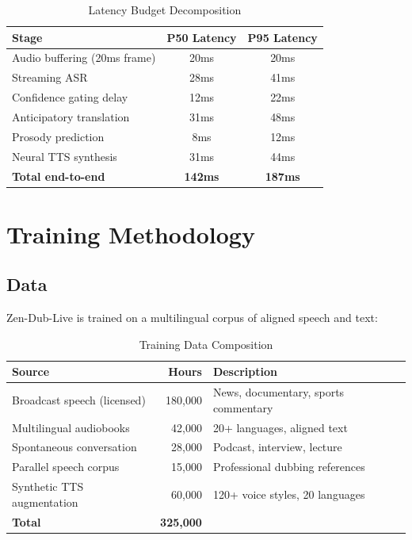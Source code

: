 \documentclass[11pt,a4paper]{article}
\begin{document}
\begin{table}[H]
\centering
\caption{Latency Budget Decomposition}
\begin{tabular}{lcc}
\toprule
\textbf{Stage} & \textbf{P50 Latency} & \textbf{P95 Latency} \\
\midrule
Audio buffering (20ms frame) & 20ms & 20ms \\
Streaming ASR & 28ms & 41ms \\
Confidence gating delay & 12ms & 22ms \\
Anticipatory translation & 31ms & 48ms \\
Prosody prediction & 8ms & 12ms \\
Neural TTS synthesis & 31ms & 44ms \\
\midrule
\textbf{Total end-to-end} & \textbf{142ms} & \textbf{187ms} \\
\bottomrule
\end{tabular}
\end{table}

\section{Training Methodology}

\subsection{Data}

Zen-Dub-Live is trained on a multilingual corpus of aligned speech and text:

\begin{table}[H]
\centering
\caption{Training Data Composition}
\begin{tabular}{lrl}
\toprule
\textbf{Source} & \textbf{Hours} & \textbf{Description} \\
\midrule
Broadcast speech (licensed) & 180,000 & News, documentary, sports commentary \\
Multilingual audiobooks & 42,000 & 20+ languages, aligned text \\
Spontaneous conversation & 28,000 & Podcast, interview, lecture \\
Parallel speech corpus & 15,000 & Professional dubbing references \\
Synthetic TTS augmentation & 60,000 & 120+ voice styles, 20 languages \\
\midrule
\textbf{Total} & \textbf{325,000} & \\
\bottomrule
\end{tabular}
\end{table}
\end{document}
